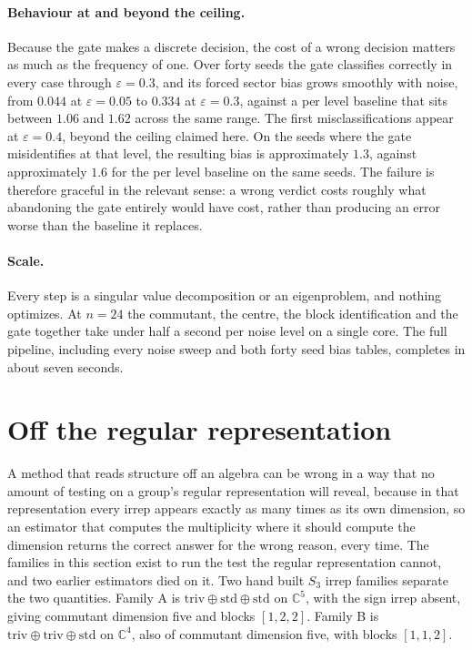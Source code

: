 \documentclass[10pt,a4paper]{amsart}
\begin{document}
\paragraph{Behaviour at and beyond the ceiling.}
Because the gate makes a discrete decision, the cost of a wrong decision matters
as much as the frequency of one. Over forty seeds the gate classifies correctly
in every case through $\varepsilon=0.3$, and its forced sector bias grows
smoothly with noise, from $0.044$ at $\varepsilon=0.05$ to $0.334$ at
$\varepsilon=0.3$, against a per level baseline that sits between $1.06$ and
$1.62$ across the same range. The first misclassifications appear at
$\varepsilon=0.4$, beyond the ceiling claimed here. On the seeds where the gate
misidentifies at that level, the resulting bias is approximately $1.3$, against
approximately $1.6$ for the per level baseline on the same seeds. The failure is
therefore graceful in the relevant sense: a wrong verdict costs roughly what
abandoning the gate entirely would have cost, rather than producing an error
worse than the baseline it replaces.

\paragraph{Scale.}
Every step is a singular value decomposition or an eigenproblem, and nothing
optimizes. At $n=24$ the commutant, the centre, the block identification and the
gate together take under half a second per noise level on a single core. The full pipeline, including every noise sweep and both forty seed bias tables,
completes in about seven seconds.

\section{Off the regular representation}\label{sec:nonreg}
A method that reads structure off an algebra can be wrong in a way that no amount
of testing on a group's regular representation will reveal, because in that
representation every irrep appears exactly as many times as its own dimension, so
an estimator that computes the multiplicity where it should compute the dimension
returns the correct answer for the wrong reason, every time. The families in this
section exist to run the test the regular representation cannot, and two earlier
estimators died on it.
Two hand built $S_3$ irrep families separate the two quantities. Family A is
$\mathrm{triv}\oplus\mathrm{std}\oplus\mathrm{std}$ on $\mathbb{C}^5$, with the
sign irrep absent, giving commutant dimension five and blocks $[1,2,2]$. Family B
is $\mathrm{triv}\oplus\mathrm{triv}\oplus\mathrm{std}$ on $\mathbb{C}^4$, also
of commutant dimension five, with blocks $[1,1,2]$.
\end{document}
